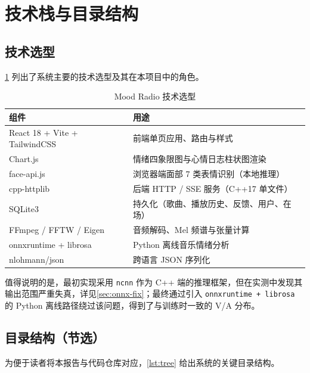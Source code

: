 \section{技术栈与目录结构}

\subsection{技术选型}

\cref{tab:stack} 列出了系统主要的技术选型及其在本项目中的角色。

\begin{table}[!htb]
  \centering
  \caption{Mood Radio 技术选型}\label{tab:stack}
  \begin{tabularx}{\linewidth}{lX}
    \toprule
    \textbf{组件} & \textbf{用途} \\
    \midrule
    React 18 + Vite + TailwindCSS & 前端单页应用、路由与样式 \\
    Chart.js & 情绪四象限图与心情日志柱状图渲染 \\
    face-api.js & 浏览器端面部 7 类表情识别（本地推理） \\
    cpp-httplib & 后端 HTTP / SSE 服务（C++17 单文件） \\
    SQLite3 & 持久化（歌曲、播放历史、反馈、用户、在场） \\
    FFmpeg / FFTW / Eigen & 音频解码、Mel 频谱与张量计算 \\
    onnxruntime + librosa & Python 离线音乐情绪分析 \\
    nlohmann/json & 跨语言 JSON 序列化 \\
    \bottomrule
  \end{tabularx}
\end{table}

值得说明的是，最初实现采用 \texttt{ncnn} 作为 C++ 端的推理框架，但在实测中发现其输出范围严重失真，详见\cref{sec:onnx-fix}；最终通过引入 \texttt{onnxruntime + librosa} 的 Python 离线路径绕过该问题，得到了与训练时一致的 V/A 分布。

\subsection{目录结构（节选）}

为便于读者将本报告与代码仓库对应，\cref{lst:tree} 给出系统的关键目录结构。

